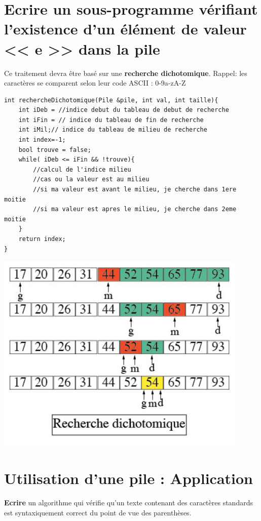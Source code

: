 \documentclass[french]{article}
\begin{document}
\section{Ecrire un sous-programme vérifiant l’existence d’un élément de valeur << e >> dans la pile}

Ce traitement devra être basé sur une \textbf{recherche dichotomique}. Rappel: les caractères se comparent selon leur code ASCII : 0-9a-zA-Z 

\noindent\begin{minipage}{.65\textwidth}
	\begin{lstlisting}[caption={Recherche dichotomique dans un tableau trie}]
int rechercheDichotomique(Pile &pile, int val, int taille){
    int iDeb = //indice debut du tableau de debut de recherche
    int iFin = // indice du tableau de fin de recherche
    int iMil;// indice du tableau de milieu de recherche
    int index=-1;
    bool trouve = false;
    while( iDeb <= iFin && !trouve){
        //calcul de l'indice milieu
        //cas ou la valeur est au milieu
        //si ma valeur est avant le milieu, je cherche dans 1ere moitie
        //si ma valeur est apres le milieu, je cherche dans 2eme moitie
    }
    return index;
}
	\end{lstlisting}
\end{minipage}
\begin{minipage}{.45\textwidth}

		\includegraphics[width=0.9\textwidth]{dicho.jpg}

\end{minipage}\hfill


\section{Utilisation d’une pile : Application}
\textbf{Ecrire} un algorithme qui vérifie qu’un texte contenant des caractères standards est syntaxiquement correct du point de vue des parenthèses.
\end{document}
